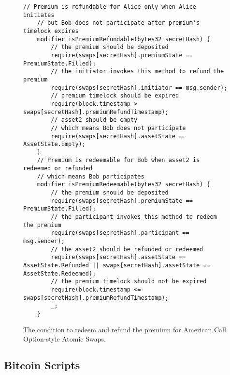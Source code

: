 \begin{figure}
    \begin{lstlisting}[language=Solidity, basicstyle=\tiny]
    // Premium is refundable for Alice only when Alice initiates
    // but Bob does not participate after premium's timelock expires
    modifier isPremiumRefundable(bytes32 secretHash) {
        // the premium should be deposited
        require(swaps[secretHash].premiumState == PremiumState.Filled);
        // the initiator invokes this method to refund the premium
        require(swaps[secretHash].initiator == msg.sender);
        // premium timelock should be expired
        require(block.timestamp > swaps[secretHash].premiumRefundTimestamp);
        // asset2 should be empty
        // which means Bob does not participate
        require(swaps[secretHash].assetState == AssetState.Empty);
    }
    // Premium is redeemable for Bob when asset2 is redeemed or refunded
    // which means Bob participates
    modifier isPremiumRedeemable(bytes32 secretHash) {
        // the premium should be deposited
        require(swaps[secretHash].premiumState == PremiumState.Filled);
        // the participant invokes this method to redeem the premium
        require(swaps[secretHash].participant == msg.sender);
        // the asset2 should be refunded or redeemed
        require(swaps[secretHash].assetState == AssetState.Refunded || swaps[secretHash].assetState == AssetState.Redeemed);
        // the premium timelock should not be expired
        require(block.timestamp <= swaps[secretHash].premiumRefundTimestamp);
        _;
    }
    \end{lstlisting}
    \label{code:premium_condition_options}
    \caption{The condition to redeem and refund the premium for American Call Option-style Atomic Swaps.}
\end{figure}

\subsection{Bitcoin Scripts}

